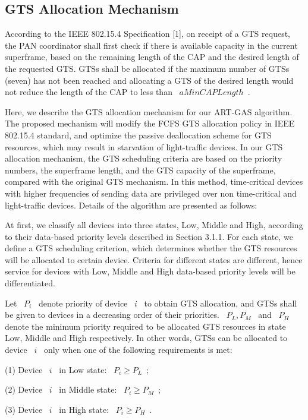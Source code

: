 \documentclass[letterpaper]{sig-alternate-10pt}
\begin{document}
\subsection{GTS Allocation Mechanism}
According to the IEEE 802.15.4 Specification [1], on receipt of a GTS request, the PAN coordinator shall first check if there is available capacity in the current superframe, based on the remaining length of the CAP and the desired length of the requested GTS. GTSs shall be allocated if the maximum number of GTSs (seven) has not been reached and allocating a GTS of the desired length would not reduce the length of the CAP to less than ~$aMinCAPLength$~.

Here, we describe the GTS allocation mechanism for our ART-GAS algorithm. The proposed mechanism will modify the FCFS GTS allocation policy in IEEE 802.15.4 standard, and optimize the passive deallocation scheme for GTS resources, which may result in starvation of light-traffic devices. In our GTS allocation mechanism, the GTS scheduling criteria are based on the priority numbers, the superframe length, and the GTS capacity of the superframe, compared with the original GTS mechanism. In this method, time-critical devices with higher frequencies of sending data are privileged over non time-critical and light-traffic devices. Details of the algorithm are presented as follows:

At first, we classify all devices into three states, Low, Middle and High, according to their data-based priority levels described in Section 3.1.1. For each state, we define a GTS scheduling criterion, which determines whether the GTS resources will be allocated to certain device. Criteria for different states are different, hence service for devices with Low, Middle and High data-based priority levels will be differentiated.

Let ~$P_i$~ denote priority of device ~$i$~ to obtain GTS allocation, and GTSs shall be given to devices in a decreasing order of their priorities. ~$P_L, P_M$~ and ~$P_H$~ denote the minimum priority required to be allocated GTS resources in state Low, Middle and High respectively. In other words, GTSs can be allocated to device ~$i$~ only when one of the following requirements is met:

(1)	Device ~$i$~ in Low state: ~${P_i} \ge {P_L}$~;

(2)	Device ~$i$~ in Middle state: ~${P_i} \ge {P_M}$~;

(3)	Device ~$i$~ in High state: ~${P_i} \ge {P_H}$~.
\end{document}
